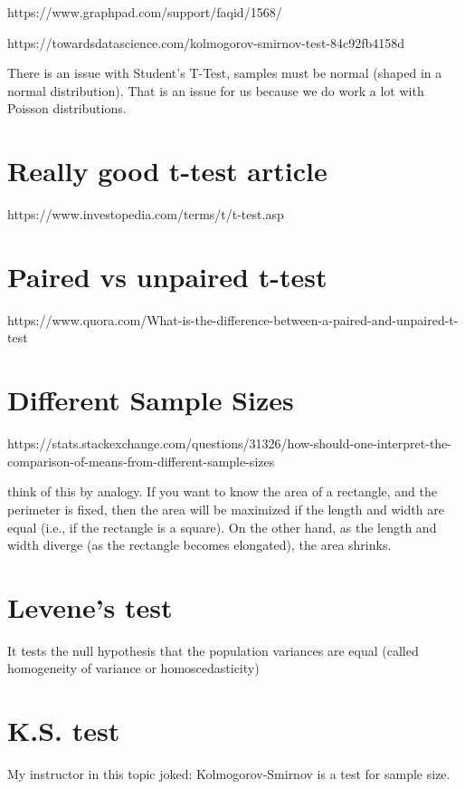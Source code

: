 \documentclass[11pt]{article}
\begin{document}
https://www.graphpad.com/support/faqid/1568/

https://towardsdatascience.com/kolmogorov-smirnov-test-84c92fb4158d

There is an issue with Student's T-Test, samples must be normal (shaped
in a normal distribution). That is an issue for us because we do work a
lot with Poisson distributions.

\section{Really good t-test article}\label{really-good-t-test-article}

https://www.investopedia.com/terms/t/t-test.asp

\section{Paired vs unpaired t-test}\label{paired-vs-unpaired-t-test}

https://www.quora.com/What-is-the-difference-between-a-paired-and-unpaired-t-test

\section{Different Sample Sizes}\label{different-sample-sizes}

https://stats.stackexchange.com/questions/31326/how-should-one-interpret-the-comparison-of-means-from-different-sample-sizes

think of this by analogy. If you want to know the area of a rectangle,
and the perimeter is fixed, then the area will be maximized if the
length and width are equal (i.e., if the rectangle is a square). On the
other hand, as the length and width diverge (as the rectangle becomes
elongated), the area shrinks.

\section{Levene's test}\label{levenes-test}

It tests the null hypothesis that the population variances are equal
(called homogeneity of variance or homoscedasticity)

\section{K.S. test}\label{k.s.-test}

My instructor in this topic joked: Kolmogorov-Smirnov is a test for
sample size.
\end{document}
